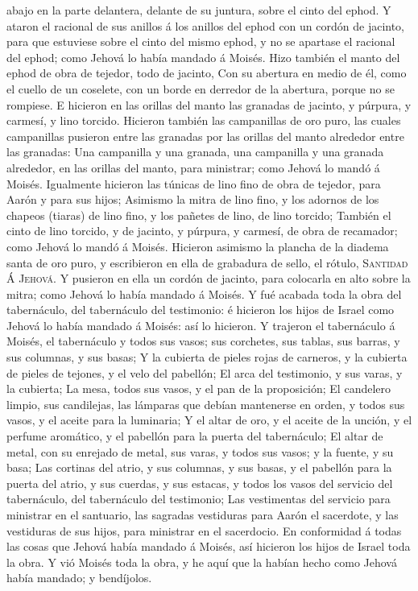 abajo en la parte delantera, delante de su juntura, sobre el cinto del
ephod.  Y ataron el racional de sus anillos á los anillos
del ephod con un cordón de jacinto, para que estuviese sobre el cinto
del mismo ephod, y no se apartase el racional del ephod; como Jehová lo
había mandado á Moisés.  Hizo también el manto del ephod
de obra de tejedor, todo de jacinto,  Con su abertura en
medio de él, como el cuello de un coselete, con un borde en derredor de
la abertura, porque no se rompiese.  E hicieron en las
orillas del manto las granadas de jacinto, y púrpura, y carmesí, y lino
torcido.  Hicieron también las campanillas de oro puro,
las cuales campanillas pusieron entre las granadas por las orillas del
manto alrededor entre las granadas:  Una campanilla y una
granada, una campanilla y una granada alrededor, en las orillas del
manto, para ministrar; como Jehová lo mandó á Moisés. 
Igualmente hicieron las túnicas de lino fino de obra de tejedor, para
Aarón y para sus hijos;  Asimismo la mitra de lino fino,
y los adornos de los chapeos (tiaras) de lino fino, y los pañetes de
lino, de lino torcido;  También el cinto de lino torcido,
y de jacinto, y púrpura, y carmesí, de obra de recamador; como Jehová lo
mandó á Moisés.  Hicieron asimismo la plancha de la
diadema santa de oro puro, y escribieron en ella de grabadura de sello,
el rótulo, \textsc{Santidad} Á \textsc{Jehová}.  Y
pusieron en ella un cordón de jacinto, para colocarla en alto sobre la
mitra; como Jehová lo había mandado á Moisés.  Y fué
acabada toda la obra del tabernáculo, del tabernáculo del testimonio: é
hicieron los hijos de Israel como Jehová lo había mandado á Moisés: así
lo hicieron.  Y trajeron el tabernáculo á Moisés, el
tabernáculo y todos sus vasos; sus corchetes, sus tablas, sus barras, y
sus columnas, y sus basas;  Y la cubierta de pieles rojas
de carneros, y la cubierta de pieles de tejones, y el velo del pabellón;
 El arca del testimonio, y sus varas, y la cubierta;
 La mesa, todos sus vasos, y el pan de la proposición;
 El candelero limpio, sus candilejas, las lámparas que
debían mantenerse en orden, y todos sus vasos, y el aceite para la
luminaria;  Y el altar de oro, y el aceite de la unción,
y el perfume aromático, y el pabellón para la puerta del tabernáculo;
 El altar de metal, con su enrejado de metal, sus varas,
y todos sus vasos; y la fuente, y su basa;  Las cortinas
del atrio, y sus columnas, y sus basas, y el pabellón para la puerta del
atrio, y sus cuerdas, y sus estacas, y todos los vasos del servicio del
tabernáculo, del tabernáculo del testimonio;  Las
vestimentas del servicio para ministrar en el santuario, las sagradas
vestiduras para Aarón el sacerdote, y las vestiduras de sus hijos, para
ministrar en el sacerdocio.  En conformidad á todas las
cosas que Jehová había mandado á Moisés, así hicieron los hijos de
Israel toda la obra.  Y vió Moisés toda la obra, y he
aquí que la habían hecho como Jehová había mandado; y bendíjolos.

